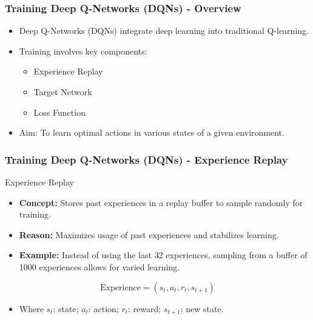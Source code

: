 \documentclass[aspectratio=169]{beamer}
\begin{document}
\begin{frame}[fragile]
    \frametitle{Training Deep Q-Networks (DQNs) - Overview}
    \begin{itemize}
        \item Deep Q-Networks (DQNs) integrate deep learning into traditional Q-learning.
        \item Training involves key components:
        \begin{itemize}
            \item Experience Replay
            \item Target Network
            \item Loss Function
        \end{itemize}
        \item Aim: To learn optimal actions in various states of a given environment.
    \end{itemize}
\end{frame}

\begin{frame}[fragile]
    \frametitle{Training Deep Q-Networks (DQNs) - Experience Replay}
    \begin{block}{Experience Replay}
        \begin{itemize}
            \item \textbf{Concept:} Stores past experiences in a replay buffer to sample randomly for training.
            \item \textbf{Reason:} Maximizes usage of past experiences and stabilizes learning.
            \item \textbf{Example:} Instead of using the last 32 experiences, sampling from a buffer of 1000 experiences allows for varied learning.
        \end{itemize}
    \end{block}
    
    \begin{equation}
        \text{Experience} = (s_t, a_t, r_t, s_{t+1})
    \end{equation}
    \begin{itemize}
        \item Where \( s_t \): state; \( a_t \): action; \( r_t \): reward; \( s_{t+1} \): new state.
    \end{itemize}
\end{frame}
\end{document}
